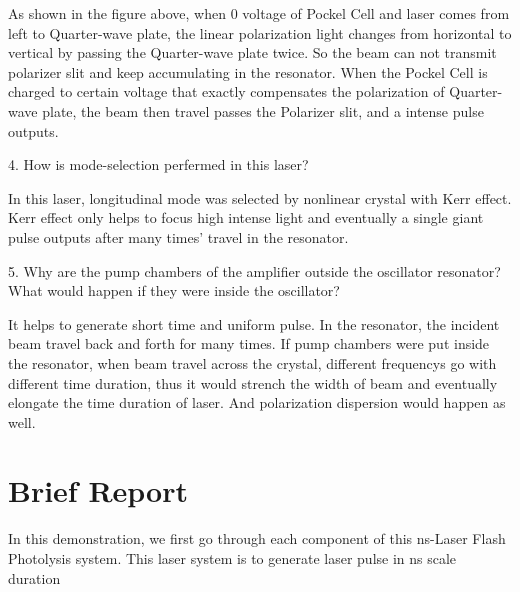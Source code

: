 \documentclass{article}
\begin{document}
As shown in the figure above, when 0 voltage of Pockel Cell and laser comes from left to Quarter-wave plate, the linear polarization light changes from horizontal to vertical by passing the Quarter-wave plate twice. So the beam can not transmit polarizer slit and keep accumulating in the resonator. When the Pockel Cell is charged to certain voltage that exactly compensates the polarization of Quarter-wave plate, the beam then travel passes the Polarizer slit, and a intense pulse outputs. \\
\par 
4. How is mode-selection perfermed in this laser?\par 
In this laser, longitudinal mode was selected by nonlinear crystal with Kerr effect. Kerr effect only helps to focus high intense light and eventually a single giant pulse outputs after many times' travel in the resonator. \\
\par 
5. Why are the pump chambers of the amplifier outside the oscillator resonator? What would happen if they were inside the oscillator?\par 
It helps to generate short time and uniform pulse. In the resonator, the incident beam travel back and forth for many times. If pump chambers were put inside the resonator, when beam travel across the crystal, different frequencys go with different time duration, thus it would strench the width of beam and eventually elongate the time duration of laser. And polarization dispersion would happen as well.\\
\par 
\section{Brief Report}
In this demonstration, we first go through each component of this ns-Laser Flash Photolysis system. This laser system is to generate laser pulse in ns scale duration
\end{document}
